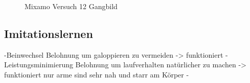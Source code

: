 \begin{figure}[H]
\begin{tabular}{ccc}
  \end{tabular}
  \caption{Mixamo Versuch 12 Gangbild}
  \label{fig:mixamo_versuch12_gangbild}
\end{figure}

\subsection{Imitationslernen}

-Beinwechsel Belohnung um galoppieren zu vermeiden -> funktioniert
-Leistungsminimierung Belohnung um laufverhalten natürlicher zu machen -> funktioniert nur arme sind sehr nah und starr am Körper
-